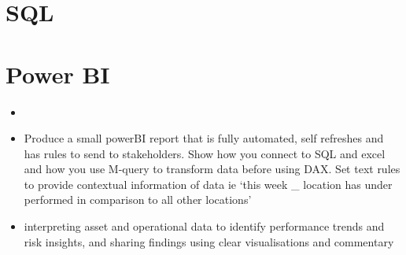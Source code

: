 \documentclass[
  letterpaper,
]{scrbook}
\begin{document}

\chapter{SQL}\label{sql-1}


\chapter{Power BI}\label{power-bi-1}

\begin{itemize}
\item
\item
  Produce a small powerBI report that is fully automated, self refreshes
  and has rules to send to stakeholders. Show how you connect to SQL and
  excel and how you use M-query to transform data before using DAX. Set
  text rules to provide contextual information of data ie `this week \_
  location has under performed in comparison to all other locations'
\item
  interpreting asset and operational data to identify performance trends
  and risk insights, and sharing findings using clear visualisations and
  commentary
\end{itemize}


\backmatter
\end{document}

